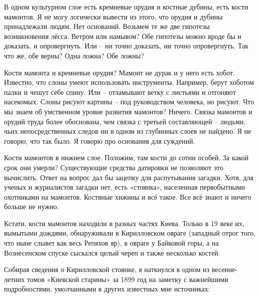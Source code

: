 В одном культурном слое есть кремневые орудия и костные дубины, есть кости мамонтов. Я не могу логически вывести из этого, что орудия и дубины принадлежали людям. Нет оснований. Возьмем те же две гипотезы возникновения лёсса. Ветром или намывом? Обе гипотезы можно вроде бы и доказать, и опровергнуть. Или – ни точно доказать, ни точно опровергнуть. Так что же, обе верны? Одна ложна? Обе ложны? 

Кости мамонта и кремневые орудия? Мамонт не дурак и у него есть хобот. Известно, что слоны умеют использовать инструменты. Например, берут хоботом палки и чешут себе спину. Или – отламывают ветку с листьями и отгоняют насекомых. Слоны рисуют картины – под руководством человека, но рисуют. Что мы знаем об умственном уровне развития мамонтов? Ничего. Связка мамонтов и орудий труда более обоснована, чем связка с третьей составляющей – людьми, чьих непосредственных следов ни в одном из глубинных слоев не найдено. Я не говорю, что так было. Я говорю про основания для суждений.

Кости мамонтов в нижнем слое. Положим, там кости до сотни особей. За какой срок они умерли? Существующие средства датировки не позволяют это вычислить. Ответ на вопрос дал бы зацепку для распутывания загадки. Хотя, для ученых и журналистов загадки нет, есть «стоянка», населенная первобытными охотниками на мамонтов. Костяные хижины и всё такое. Все всё знают и ничего больше не нужно.

Кстати, кости мамонтов находили в разных частях Киева. Только в 19 веке их, вымытыми дождями, обнаруживали в Кирилловском овраге (западный отрог того, что ныне слывет как весь Репяхов яр), в овраге у Байковой горы, а на Вознесенском спуске сыскался целый череп и также несколько костей.

Собирая сведения о Кирилловской стоянке, я наткнулся в одном из весенне-летних томов «Киевской старины» за 1899 год на заметку с важнейшими подробностями, умолчанными в других известных мне источниках:
 
